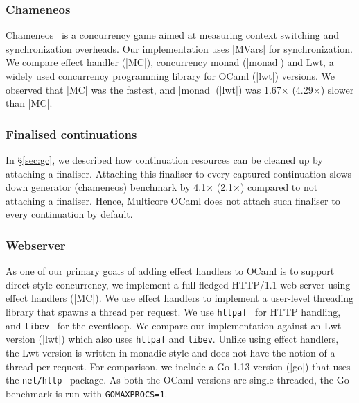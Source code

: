 \documentclass[sigplan,screen]{acmart}
\begin{document}
\subsubsection{Chameneos}

Chameneos~\cite{Chameneos} is a concurrency game aimed at measuring context
switching and synchronization overheads. Our implementation uses |MVars| for
synchronization. We compare effect handler (|MC|), concurrency monad (|monad|)
and Lwt, a widely used concurrency programming library for OCaml (|lwt|)
versions. We observed that |MC| was the fastest, and |monad| (|lwt|) was
1.67$\times$ (4.29$\times$) slower than |MC|.

\subsubsection{Finalised continuations}
\label{sec:res_final_k}

In \S\ref{sec:gc}, we described how continuation resources can be cleaned up by
attaching a finaliser. Attaching this finaliser to every captured continuation
slows down generator (chameneos) benchmark by 4.1$\times$ (2.1$\times$)
compared to not attaching a finaliser. Hence, Multicore OCaml does not attach
such finaliser to every continuation by default.

\subsubsection{Webserver}

As one of our primary goals of adding effect handlers to OCaml is to support
direct style concurrency, we implement a full-fledged HTTP/1.1 web server using
effect handlers (|MC|). We use effect handlers to implement a user-level
threading library that spawns a thread per request. We use
\texttt{httpaf}~\cite{httpaf} for HTTP handling, and
\texttt{libev}~\cite{libev} for the eventloop. We compare our implementation
against an Lwt version (|lwt|) which also uses \texttt{httpaf} and
\texttt{libev}. Unlike using effect handlers, the Lwt version is written in
monadic style and does not have the notion of a thread per request. For
comparison, we include a Go 1.13 version (|go|) that uses the
\texttt{net/http}~\cite{nethttp} package. As both the OCaml versions are single
threaded, the Go benchmark is run with \texttt{GOMAXPROCS=1}.
\end{document}
